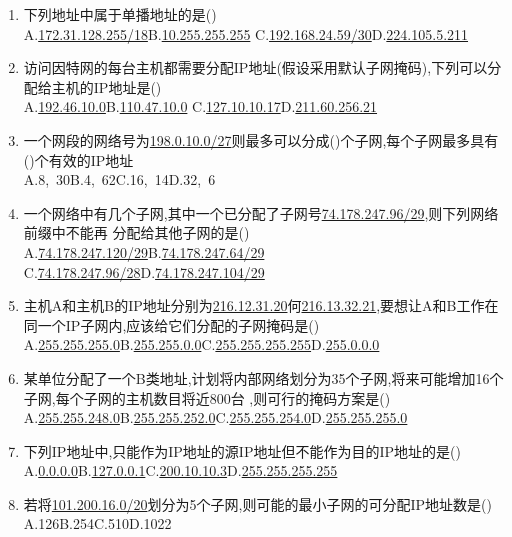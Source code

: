 \documentclass[12pt, a4paper, oneside, UTF8]{ctexbook}
\begin{document}
\begin{enumerate}
    \item 下列地址中属于单播地址的是() \\
    A.\underline{172.31.128.255/18}\qquad B.\underline{10.255.255.255}\qquad
    C.\underline{192.168.24.59/30}\qquad D.\underline{224.105.5.211}

    \item 访问因特网的每台主机都需要分配IP地址(假设采用默认子网掩码),下列可以分配给主机的IP地址是() \\
    A.\underline{192.46.10.0}\qquad B.\underline{110.47.10.0}\qquad
    C.\underline{127.10.10.17}\qquad D.\underline{211.60.256.21}

    \item 一个网段的网络号为\underline{198.0.10.0/27}则最多可以分成()个子网,每个子网最多具有()个有效的IP地址 \\
    A.8,\ 30\qquad B.4,\ 62\qquad C.16,\ 14\qquad D.32,\ 6 

    \item 一个网络中有几个子网,其中一个已分配了子网号\underline{74.178.247.96/29},则下列网络前缀中不能再
    分配给其他子网的是() \\
    A.\underline{74.178.247.120/29}\quad B.\underline{74.178.247.64/29}\quad
    C.\underline{74.178.247.96/28}\quad D.\underline{74.178.247.104/29}

    \item 主机A和主机B的IP地址分别为\underline{216.12.31.20}何\underline{216.13.32.21},要想让A和B工作在
    同一个IP子网内,应该给它们分配的子网掩码是() \\
    A.\underline{255.255.255.0}\qquad B.\underline{255.255.0.0}\qquad C.\underline{255.255.255.255}\qquad D.\underline{255.0.0.0}

    \item 某单位分配了一个B类地址,计划将内部网络划分为35个子网,将来可能增加16个子网,每个子网的主机数目将近800台
    ,则可行的掩码方案是() \\
    A.\underline{255.255.248.0}\qquad B.\underline{255.255.252.0}\qquad C.\underline{255.255.254.0}\qquad D.\underline{255.255.255.0}

    \item 下列IP地址中,只能作为IP地址的源IP地址但不能作为目的IP地址的是() \\
    A.\underline{0.0.0.0}\qquad B.\underline{127.0.0.1}\qquad C.\underline{200.10.10.3}\qquad D.\underline{255.255.255.255}

    \item 若将\underline{101.200.16.0/20}划分为5个子网,则可能的最小子网的可分配IP地址数是() \\
    A.126\qquad B.254\qquad C.510\qquad D.1022


\end{enumerate}
\end{document}
